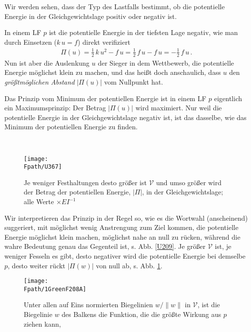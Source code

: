 {{{{{Wir werden sehen, dass der Typ des Lastfalls bestimmt, ob die potentielle Energie in der Gleichgewichtslage positiv oder negativ ist.

In einem LF $p$ ist die potentielle Energie in der tiefsten Lage negativ, wie man durch Einsetzen ($ k\,u = f$) direkt verifiziert
\begin{align}
\Pi(u) = \frac{1}{2}\,k\,u^2 - f\,u = \frac{1}{2}\, f\,u - f\,u = - \frac{1}{2}\, f\,u\,.
\end{align}
Nun ist aber die Auslenkung $ u $ der Sieger in dem Wettbewerb, die potentielle Energie m\"{o}glichst klein zu machen, und das hei{\ss}t doch anschaulich, dass $ u $ den {\em gr\"{o}{\ss}tm\"{o}glichen Abstand\/} $|\Pi(u)|$ vom Nullpunkt hat.\\

\hspace*{-12pt}\colorbox{highlightBlue}{\parbox{0.98\textwidth}{Das Prinzip vom Minimum der potentiellen Energie ist in einem LF $p$ eigentlich ein Maximumsprinzip: Der Betrag $|\Pi(u)|$ wird maximiert. Nur weil die potentielle Energie in der Gleichgewichtslage negativ ist, ist das dasselbe, wie das Minimum der potentiellen Energie zu finden.}}
\\

\begin{figure}[tbp]
\centering
\if {} \sidecaption \fi
\texttt{[image: \\Fpath/U367]}
\caption{Je weniger Festhaltungen desto gr\"{o}{\ss}er ist $\mathcal{V}$ und umso gr\"{o}{\ss}er wird der Betrag der potentiellen Energie, $|\Pi|$, in der Gleichgewichtslage; alle Werte $\times EI^{-1}$}
\label{U367}
\end{figure}%

Wir interpretieren das Prinzip in der Regel so, wie es die Wortwahl (anscheinend)  suggeriert, mit m\"{o}glichst wenig Anstrengung zum Ziel kommen, die potentielle Energie m\"{o}glichst klein machen, m\"{o}glichst nahe an null zu r\"{u}cken, w\"{a}hrend die wahre Bedeutung genau das Gegenteil ist, s. Abb. \ref{U209}. Je gr\"{o}{\ss}er $\mathcal{V}$ ist, je weniger Fesseln es gibt, desto negativer wird die potentielle Energie bei demselbe $p$, desto weiter r\"{u}ckt $|\Pi(w)|$ von null ab, s. Abb. \ref{U367}.
\begin{figure}[tbp]
\centering
\if {} \sidecaption \fi
\texttt{[image: \\Fpath/1GreenF208A]}
\caption{Unter allen auf Eins normierten Biegelinien $w/\|w\|$ in $\mathcal{V}$, ist die Biegelinie $w$ des Balkens die Funktion, die die gr\"{o}{\ss}te Wirkung aus $p$ ziehen kann, \cite{Ha6} }
\label{Supremum}
\end{figure}%


}}}}}
